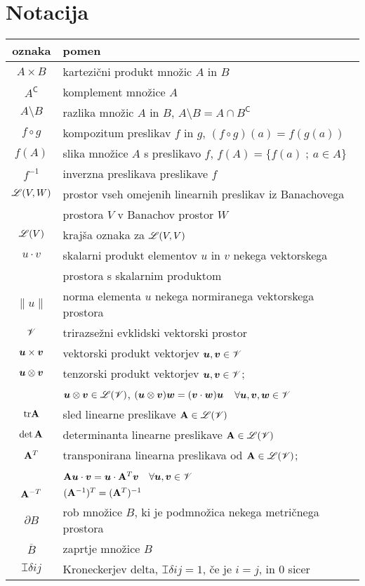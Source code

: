 \chapter*{Notacija}


\begin{center}\begin{tabular}[h]{|c|p{11cm}|}
	\hline oznaka & pomen \\ \hline%
	$A\times B$ & kartezični produkt množic $A$ in $B$ \\ %
	$A^{\mathsf C}$ & komplement množice $A$ \\ %
	$A\setminus B$ & razlika množic $A$ in $B$, $A\setminus B=A\cap B^{\mathsf C}$ \\ %
	$f\circ g$ & kompozitum preslikav $f$ in $g$, $(f\circ g)(a)=f(g(a))$ \\ %
	$f(A)$ & slika množice $A$ s preslikavo $f$, $f(A)=\{f(a)\;;\ a\in A\}$ \\ %
	$f^{-1}$ & inverzna preslikava preslikave $f$ \\ %
	$\mathscr L(V,W)$ & prostor vseh omejenih linearnih preslikav iz Banachovega \\ &
	prostora $V$ v Banachov prostor $W$ \\ %
	$\mathscr L(V)$ & krajša oznaka za $\mathscr L(V,V)$ \\ %
	$u\cdot v$ & skalarni produkt elementov $u$ in $v$ nekega vektorskega \\ &
	prostora s skalarnim produktom \\ %
	$\|u\|$ & norma elementa $u$ nekega normiranega vektorskega prostora \\ %
	$\mathscr V$ & trirazsežni evklidski vektorski prostor \\ %
	$\boldsymbol u\times\boldsymbol v$ & vektorski produkt vektorjev $\boldsymbol u,\boldsymbol v\in\mathscr V$ \\ %
	$\boldsymbol u\otimes\boldsymbol v$ & tenzorski produkt vektorjev $\boldsymbol u,\boldsymbol v\in\mathscr V$; \\
	& $\boldsymbol u\otimes\boldsymbol v\in\mathscr L(\mathscr V)$, $(\boldsymbol u\otimes\boldsymbol v)\boldsymbol w=
	(\boldsymbol v\cdot\boldsymbol w)\boldsymbol u$ \ $\forall\boldsymbol u,\boldsymbol v,\boldsymbol w\in\mathscr V$ \\ %
	$\mathrm{tr}\mathbf A$ & sled linearne preslikave $\mathbf A\in\mathscr L(\mathscr V)$ \\ %
	$\det\mathbf A$ & determinanta linearne preslikave $\mathbf A\in\mathscr L(\mathscr V)$ \\ %
	$\mathbf A^{T}$ & transponirana linearna preslikava od $\mathbf A\in\mathscr L(\mathscr V)$; \\
	& $\mathbf A\boldsymbol u\cdot\boldsymbol v=\boldsymbol u\cdot\mathbf A^{T}\boldsymbol v$ \ $\forall\boldsymbol u,\boldsymbol v\in\mathscr V$ \\ %
	$\mathbf A^{-T}$ & $(\mathbf A^{-1})^{T}=(\mathbf A^{T})^{-1}$ \\ %
	$\partial B$ & rob množice $B$, ki je podmnožica nekega metričnega prostora \\ %
	$\overline{B}$ & zaprtje množice $B$ \\ %
	$\topbot{\delta}{i}{j}$ & Kroneckerjev delta, $\topbot{\delta}{i}{j}=1$, če je $i=j$, in 0 sicer \\ \hline
\end{tabular}\end{center}

